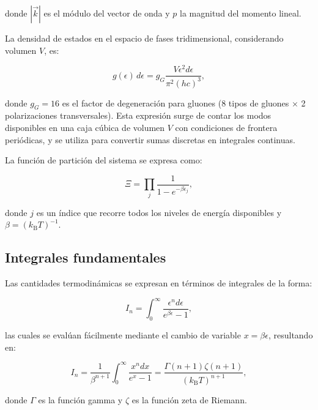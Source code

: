 donde \( |\vec{k}| \) es el módulo del vector de onda y \( p \) la magnitud del momento lineal. 

La densidad de estados en el espacio de fases tridimensional, considerando volumen \( V \), es:

\begin{equation}
g(\epsilon)\,d\epsilon = g_G \frac{V \epsilon^2 d\epsilon}{\pi^2 (hc)^3},
\end{equation}

donde \( g_G = 16 \) es el factor de degeneración para gluones (8 tipos de gluones × 2 polarizaciones transversales). Esta expresión surge de contar los modos disponibles en una caja cúbica de volumen \( V \) con condiciones de frontera periódicas, y se utiliza para convertir sumas discretas en integrales continuas.

La función de partición del sistema se expresa como:

\begin{equation}
\Xi = \prod_j \frac{1}{1 - e^{-\beta \epsilon_j}},
\end{equation}

donde \( j \) es un índice que recorre todos los niveles de energía disponibles y \( \beta = ({k}_{\mathrm{B}} T)^{-1} \).


\subsection{Integrales fundamentales}

Las cantidades termodinámicas se expresan en términos de integrales de la forma:

\begin{equation}
I_n = \int_0^\infty \frac{\epsilon^n d\epsilon}{e^{\beta\epsilon} - 1},
\end{equation}

las cuales se evalúan fácilmente mediante el cambio de variable \( x = \beta \epsilon \), resultando en:

\begin{equation}
I_n = \frac{1}{\beta^{n+1}} \int_0^\infty \frac{x^n dx}{e^x - 1} = \frac{\Gamma(n+1)\zeta(n+1)}{({k}_{\mathrm{B}} T)^{n+1}},
\end{equation}

donde \( \Gamma \) es la función gamma y \( \zeta \) es la función zeta de Riemann.


